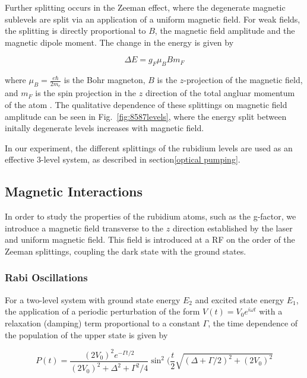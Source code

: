 Further splitting occurs in the Zeeman effect, where the degenerate
magnetic sublevels are split via an application of a uniform magnetic
field. For weak fields, the splitting is directly proportional to $B$,
the magnetic field amplitude and the magnetic dipole moment. The
change in the energy is given by

\begin{equation}
\Delta E = g_F\mu_B B m_F
\label{eqn:zeeman}
\end{equation}

where $\mu_B = \frac{e\hbar}{2m_e}$ is the Bohr magneton, $B$ is the
$z$-projection of the magnetic field, and $m_F$ is the spin projection
in the $z$ direction of the total angluar momentum of the atom
\cite{budker }. The qualitative dependence of these splittings on
magnetic field amplitude can be seen in Fig.~\ref{fig:8587levels},
where the energy split between initally degenerate levels increases
with magnetic field.

In our experiment, the different splittings of the rubidium levels are
used as an effective 3-level system, as described in
section\ref{optical pumping}. 

\subsection{Magnetic Interactions}

In order to study the properties of the rubidium atoms, such as the
g-factor, we introduce a magnetic field transverse to the $z$
direction established by the laser and uniform magnetic field. This
field is introduced at a RF on the order of the Zeeman splittings,
coupling the dark state with the ground states. 

\subsubsection{Rabi Oscillations}

For a two-level system with ground state energy $E_2$ and excited
state energy $E_1$, the application of a periodic perturbation of the
form $V(t) = V_0e^{i\omega t}$ with a relaxation (damping) term
proportional to a constant $\Gamma$, the time dependence of the
population of the upper state is given by

\begin{equation}
P(t) = \frac{(2V_0)^2e^{-\Gamma t/2}}{(2V_0)^2 +\Delta^2 + \Gamma^2/4}\sin^2(\frac{t}{2}\sqrt{(\Delta + \Gamma/2)^2 + (2V_0)^2}
\end{equation}

